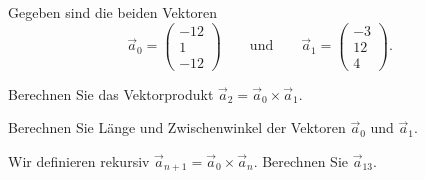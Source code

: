 Gegeben sind die beiden Vektoren
\[
\vec{a}_0
=
\begin{pmatrix}
  -12\\
    1\\
  -12
\end{pmatrix}
\qquad\text{und}\qquad
\vec{a}_1
=
\begin{pmatrix}
   -3\\
   12\\
    4
\end{pmatrix}.
\]
\begin{teilaufgaben}
\item
Berechnen Sie das Vektorprodukt $\vec{a}_2 = \vec{a}_0\times\vec{a}_1$.
\item
Berechnen Sie Länge und Zwischenwinkel der Vektoren $\vec{a}_0$ und $\vec{a}_1$.
\item
Wir definieren rekursiv
$\vec{a}_{n+1} = \vec{a}_0\times \vec{a}_n$.
Berechnen Sie $\vec{a}_{13}$.
\end{teilaufgaben}

